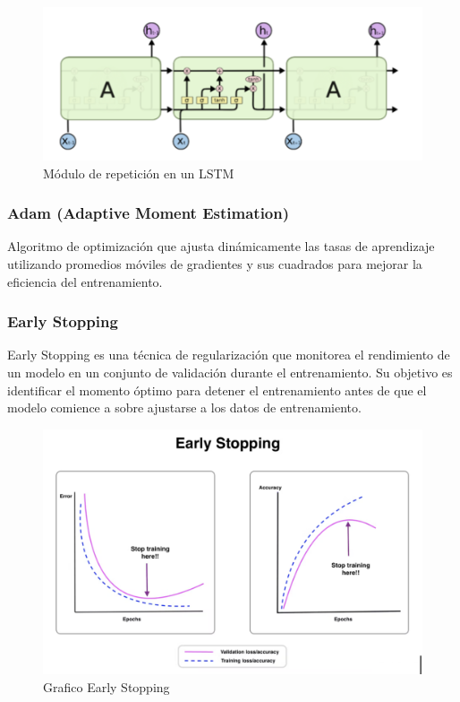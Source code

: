 \documentclass{article}
\begin{document}
\begin{figure}[!hbtp]
    \centering
    \includegraphics[width=5in]{figuras/modRepLSTM.png}
		\caption{Módulo de repetición en un LSTM}
		\label{fig2}
\end{figure}

\subsubsection{Adam (Adaptive Moment Estimation)}

Algoritmo de optimización que ajusta dinámicamente las tasas de aprendizaje utilizando promedios móviles de gradientes y sus cuadrados para mejorar la eficiencia del entrenamiento.

\subsubsection{Early Stopping}

Early Stopping es una técnica de regularización que monitorea el rendimiento de un modelo en un conjunto de validación durante el entrenamiento. Su objetivo es identificar el momento óptimo para detener el entrenamiento antes de que el modelo comience a sobre ajustarse a los datos de entrenamiento. 

\begin{figure}[!hbtp]
    \centering
    \includegraphics[width=5in]{figuras/EarlyStopping.png}
		\caption{Grafico Early Stopping}
		\label{fig3}
\end{figure}
\end{document}
